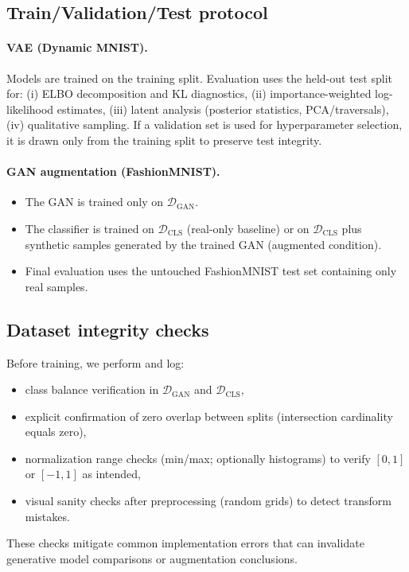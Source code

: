 \subsection{Train/Validation/Test protocol}
\label{subsec:protocol}

\paragraph{VAE (Dynamic MNIST).}
Models are trained on the training split. Evaluation uses the held-out test split for:
(i) ELBO decomposition and KL diagnostics,
(ii) importance-weighted log-likelihood estimates,
(iii) latent analysis (posterior statistics, PCA/traversals),
(iv) qualitative sampling. If a validation set is used for hyperparameter selection, it is drawn only from the training split to preserve test integrity.

\paragraph{GAN augmentation (FashionMNIST).}
\begin{itemize}
  \item The GAN is trained only on $\mathcal{D}_{\mathrm{GAN}}$.
  \item The classifier is trained on $\mathcal{D}_{\mathrm{CLS}}$ (real-only baseline) or on $\mathcal{D}_{\mathrm{CLS}}$ plus synthetic samples generated by the trained GAN (augmented condition).
  \item Final evaluation uses the untouched FashionMNIST test set containing only real samples.
\end{itemize}

\subsection{Dataset integrity checks}
\label{subsec:integrity_checks}
Before training, we perform and log:
\begin{itemize}
  \item class balance verification in $\mathcal{D}_{\mathrm{GAN}}$ and $\mathcal{D}_{\mathrm{CLS}}$,
  \item explicit confirmation of zero overlap between splits (intersection cardinality equals zero),
  \item normalization range checks (min/max; optionally histograms) to verify $[0,1]$ or $[-1,1]$ as intended,
  \item visual sanity checks after preprocessing (random grids) to detect transform mistakes.
\end{itemize}
These checks mitigate common implementation errors that can invalidate generative model comparisons or augmentation conclusions.
